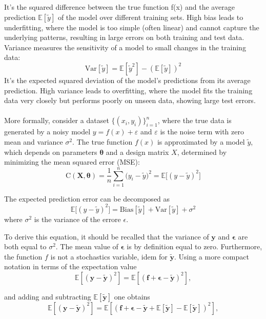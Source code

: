 \documentclass[
 reprint,            %
 amsmath,amssymb,
 aps,
]{revtex4-2}
\begin{document}
It's the squared difference between the true function f(x) and the average prediction $\mathbb{E}[\tilde y]$ of the model over different training sets. High bias leads to underfitting, where the model is too simple (often linear) and cannot capture the underlying patterns, resulting in large errors on both training and test data.
\\Variance measures the sensitivity of a model to small changes in the training data:
$$
\mathrm{Var}[\tilde y] = \mathbb{E}[\tilde y^2] - (\mathbb{E}[\tilde y])^2
$$
It's the expected squared deviation of the model's predictions from its average prediction.
High variance leads to overfitting, where the model fits the training data very closely but performs poorly on unseen data, showing large test errors.\\\\
More formally, consider a dataset $\{(x_i, y_i)\}_{i=1}^n$, where the true data is generated by a noisy model $y = f(x) + \varepsilon$ and $\varepsilon$ is the noise term with zero mean and variance $\sigma^2$. 
The true function $f(x)$ is approximated by a model $\tilde y$, which depends on parameters $\boldsymbol{\theta}$ and a design matrix $X$, determined by minimizing the mean squared error (MSE):
$$
\text{C}(\boldsymbol{X, \theta}) = \frac{1}{n} \sum_{i=1}^n \big( y_i - \tilde y \big)^2= \mathbb{E}\big[(y - \tilde y)^2\big]
$$

The expected prediction error can be decomposed as
$$\mathbb{E}[(y - \tilde y)^2\big] = \mathrm{Bias}[\tilde y] + \mathrm{Var}[\tilde y] + \sigma^2$$
where $\sigma ^2$ is the variance of the errore $\epsilon$. 

To derive this equation, it should be recalled that the variance of $\boldsymbol{y}$ and $\boldsymbol{\epsilon}$ are both equal to $\sigma^2$. The mean value of $\boldsymbol{\epsilon}$ is by definition equal to zero. Furthermore, the function $f$ is not a stochastics variable, idem for $\boldsymbol{\tilde{y}}$.
Using a more compact notation in terms of the expectation value
$$
\mathbb{E}\left[(\boldsymbol{y}-\boldsymbol{\tilde{y}})^2\right]=\mathbb{E}\left[(\boldsymbol{f}+\boldsymbol{\epsilon}-\boldsymbol{\tilde{y}})^2\right],
$$

and adding and subtracting $\mathbb{E}\left[\boldsymbol{\tilde{y}}\right]$ one obtains 
$$
\mathbb{E}\left[(\boldsymbol{y}-\boldsymbol{\tilde{y}})^2\right]=\mathbb{E}\left[(\boldsymbol{f}+\boldsymbol{\epsilon}-\boldsymbol{\tilde{y}}+\mathbb{E}\left[\boldsymbol{\tilde{y}}\right]-\mathbb{E}\left[\boldsymbol{\tilde{y}}\right])^2\right],
$$
\end{document}

